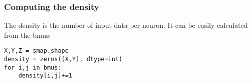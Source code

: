 \begin{frame}[fragile]
    \frametitle{Computing the density}
    The density is the number of input data per neuron. It can be easily calculated from the bmus:
    \begin{lstlisting}
X,Y,Z = smap.shape
density = zeros((X,Y), dtype=int)
for i,j in bmus:
    density[i,j]+=1
    \end{lstlisting}
\end{frame}
